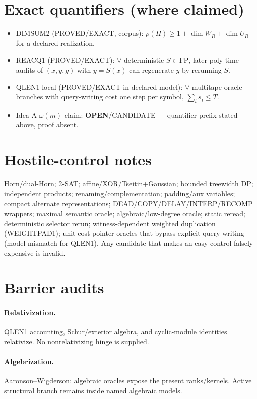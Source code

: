 \documentclass[11pt]{article}
\begin{document}
\section*{Exact quantifiers (where claimed)}
\begin{itemize}
\item DIMSUM2 (PROVED/EXACT, corpus): $\rho(H)\ge 1+\dim W_R+\dim U_R$ for a declared realization.
\item REACQ1 (PROVED/EXACT): $\forall$ deterministic $S\in\mathrm{FP}$, later poly-time audits of
$(x,y,g)$ with $y=S(x)$ can regenerate $y$ by rerunning $S$.
\item QLEN1 local (PROVED/EXACT in declared model): $\forall$ multitape oracle branches with
query-writing cost one step per symbol, $\sum_i s_i\le T$.
\item Idea A $\omega(m)$ claim: \textbf{OPEN}/CANDIDATE --- quantifier prefix stated above, proof absent.
\end{itemize}

\section*{Hostile-control notes}
Horn/dual-Horn; 2-SAT; affine/XOR/Tseitin+Gaussian; bounded treewidth DP; independent products;
renaming/complementation; padding/aux variables; compact alternate representations;
DEAD/COPY/DELAY/INTERP/RECOMP wrappers; maximal semantic oracle; algebraic/low-degree oracle;
static reread; deterministic selector rerun; witness-dependent weighted duplication (WEIGHTPAD1);
unit-cost pointer oracles that bypass explicit query writing (model-mismatch for QLEN1).
Any candidate that makes an easy control falsely expensive is invalid.

\section*{Barrier audits}
\paragraph{Relativization.}
QLEN1 accounting, Schur/exterior algebra, and cyclic-module identities relativize.
No nonrelativizing hinge is supplied.
\paragraph{Algebrization.}
Aaronson--Wigderson: algebraic oracles expose the present ranks/kernels. Active structural
branch remains inside named algebraic models.
\end{document}
